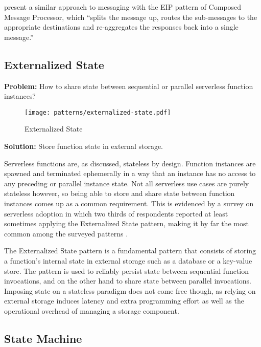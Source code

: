 \textcite{hohpe2004enterprise} present a similar approach to messaging with the EIP pattern of Composed Message Processor, which ``splits the message up, routes the sub-messages to the appropriate destinations and re-aggregates the responses back into a single message.''

\subsection{Externalized State} \label{subsec:externalizedState}

\textbf{Problem:} How to share state between sequential or parallel serverless function instances?

\begin{figure}[h]
  \centering
  \texttt{[image: patterns/externalized-state.pdf]}
  \caption{Externalized State}
  \label{fig:externalizedState}
\end{figure}

\textbf{Solution:} Store function state in external storage.

Serverless functions are, as discussed, stateless by design. Function instances are spawned and terminated ephemerally in a way that an instance has no access to any preceding or parallel instance state. Not all serverless use cases are purely stateless however, so being able to store and share state between function instances comes up as a common requirement. This is evidenced by a survey on serverless adoption in which two thirds of respondents reported at least sometimes applying the Externalized State pattern, making it by far the most common among the surveyed patterns \parencite{leitner18industrialpractice}.

The Externalized State pattern is a fundamental pattern that consists of storing a function's internal state in external storage such as a database or a key-value store. The pattern is used to reliably persist state between sequential function invocations, and on the other hand to share state between parallel invocations. Imposing state on a stateless paradigm does not come free though, as relying on external storage induces latency and extra programming effort as well as the operational overhead of managing a storage component. \parencite{leitner18industrialpractice}

\subsection{State Machine} \label{subsec:stateMachine}


